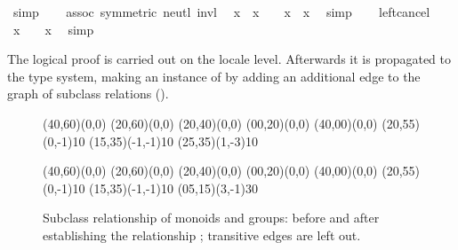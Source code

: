 \begin{isabellebody}
\ simp\isanewline
\ \ \isamarkupfalse%
\ assoc\ {}symmetric{}\ neutl\ invl\ \isamarkupfalse%
\ {}x{}\ {}\ {}x\ {}\ {}{}\ {}\ x{}\ {}\ x{}\ \isamarkupfalse%
\ simp\isanewline
\ \ \isamarkupfalse%
\ left{}cancel\ \isamarkupfalse%
\ {}x\ {}\ {}\ {}\ x{}\ \isamarkupfalse%
\ simp\isanewline
{}\isamarkupfalse%
%
\endisatagquote
{\isafoldquote}%
%
\isadelimquote
%
\endisadelimquote
%
\begin{isamarkuptext}%
The logical proof is carried out on the locale level.  Afterwards it
  is propagated to the type system, making  an instance
  of  by adding an additional edge to the graph of
  subclass relations ().

  \begin{figure}[htbp]
   \begin{center}
     \small
     \unitlength 0.6mm
     \begin{picture}(40,60)(0,0)
       \put(20,60){\makebox(0,0){}}
       \put(20,40){\makebox(0,0){}}
       \put(00,20){\makebox(0,0){}}
       \put(40,00){\makebox(0,0){}}
       \put(20,55){\vector(0,-1){10}}
       \put(15,35){\vector(-1,-1){10}}
       \put(25,35){\vector(1,-3){10}}
     \end{picture}
     \hspace{8em}
     \begin{picture}(40,60)(0,0)
       \put(20,60){\makebox(0,0){}}
       \put(20,40){\makebox(0,0){}}
       \put(00,20){\makebox(0,0){}}
       \put(40,00){\makebox(0,0){}}
       \put(20,55){\vector(0,-1){10}}
       \put(15,35){\vector(-1,-1){10}}
       \put(05,15){\vector(3,-1){30}}
     \end{picture}
     \caption{Subclass relationship of monoids and groups:
        before and after establishing the relationship
        ;  transitive edges are left out.}
     \label{fig:subclass}
   \end{center}
  \end{figure}


\end{isamarkuptext}
\end{isabellebody}
